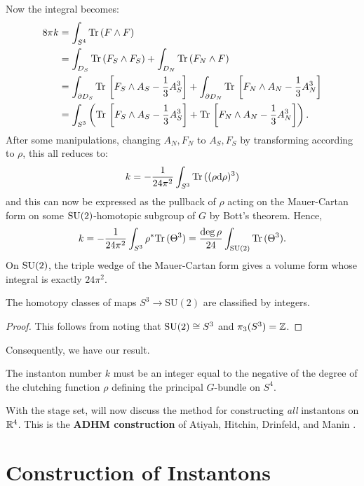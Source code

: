 		Now the integral becomes:
		\[
		\begin{aligned}
			8\pi k &= \int_{S^4} \mathrm{Tr}\, (F \wedge F)\\
				   &= \int_{D_S} \mathrm{Tr}\, (F_S \wedge F_S) + \int_{D_N} \mathrm{Tr}\, (F_N \wedge F)\\
				   &= \int_{\partial D_S} \mathrm{Tr}\, \left[F_S \wedge A_S - \frac13 A_S^3 \right] 
				   + \int_{\partial D_N} \mathrm{Tr}\, \left[F_N \wedge A_N - \frac13 A_N^3 \right]\\
				   &= \int_{S^3} \left( \mathrm{Tr}\, \left[F_S \wedge A_S - \frac13 A_S^3 \right] + \mathrm{Tr}\, \left[F_N \wedge A_N - \frac13 A_N^3 \right] \right).
		\end{aligned}
		\]
		After some manipulations, changing $A_N, F_N$ to $A_S, F_S$ by transforming according to $\rho$, this all reduces to:
		\[
			k = - \frac{1}{24\pi^2} \int_{S^3} \mathrm{Tr}\,((\rho \mathrm{d} \rho)^3)
		\]
		and this can now be expressed as the pullback of $\rho$ acting on the Mauer-Cartan form on some $\mathrm{SU}(2)$-homotopic subgroup of $G$ by Bott's theorem. Hence,
		\[
			k = - \frac{1}{24\pi^2} \int_{S^3} \rho^* \mathrm{Tr}\,(\Theta^3) = \frac{\deg \rho}{24} \int_{\mathrm{SU}(2)} \mathrm{Tr}\,(\Theta^3).
		\]
		On $\mathrm{SU}(2)$, the triple wedge of the Mauer-Cartan form gives a volume form whose integral is exactly $24\pi^2$.

		\begin{prop}
			The homotopy classes of maps $S^3 \to \mathrm{SU}(2)$ are classified by integers.
		\end{prop}
		\begin{proof}
			This follows from noting that $\mathrm{SU}(2) \cong S^3$ and $\pi_3(S^3) = \mathbb{Z}$.
		\end{proof}
		\noindent Consequently, we have our result.
		\begin{prop}
			 The instanton number $k$ must be an integer equal to the negative of the degree of the clutching function $\rho$ defining the principal $G$-bundle on $S^4$.
		\end{prop}
		
		\noindent With the stage set, will now discuss the method for constructing \emph{all} instantons on $\mathbb{R}^4$. This is the \textbf{ADHM construction} of Atiyah, Hitchin, Drinfeld, and Manin \cite{atiyah65}.



\section{Construction of Instantons} %
\label{sec:construction_of_instantons}
	
